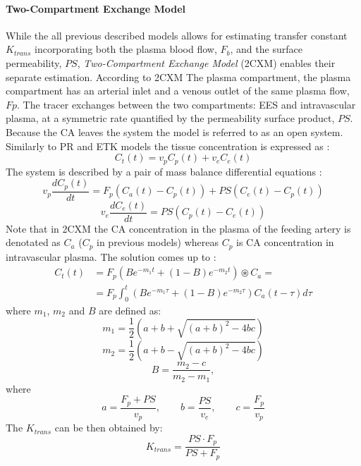 \paragraph{Two-Compartment Exchange Model}While the all previous described models allows for estimating transfer constant $K_{trans}$ incorporating both the plasma blood flow, $F_b$, and the surface permeability, $PS$, \textit{Two-Compartment Exchange Model} (2CXM) enables their separate estimation. 
According to 2CXM The plasma compartment, the plasma compartment has an arterial inlet and a venous outlet of the same plasma flow, $Fp$. 
The tracer exchanges between the two compartments: EES and intravascular plasma, at a symmetric rate quantified by the permeability surface product, $PS$.
Because the CA leaves the system the model is referred to as an open system. 
Similarly to PR and ETK models the tissue concentration is expressed as \cite{khalifa2014models}:
\begin{equation}
C_t(t) = v_pC_p(t) + v_eC_e(t)
\label{eq:2cxm}
\end{equation}
The system is described by a pair of mass balance differential equations \cite{khalifa2014models}:  
\begin{equation}
v_p\frac{dC_p(t)}{dt} = F_p(C_a(t)-C_p(t))+PS(C_e(t)-C_p(t))
\label{eq:2cxm2}
\end{equation}
\begin{equation}
v_e\frac{dC_e(t)}{dt} = PS(C_p(t)-C_e(t))
\label{eq:2cxm3}
\end{equation}
Note that in 2CXM the CA concentration in the plasma of the feeding artery is denotated as $C_a$ ($C_p$ in previous models) whereas $C_p$ is CA concentration in intravascular plasma. The solution comes up to \cite{khalifa2014models}:
\begin{align}
	\label{eq:2cxm4}
	\nonumber C_{t}(t) &=F_p (Be^{-m_1t}+(1-B)e^{-m_2t})\circledast C_a =\\
	&= F_{p} \int_{0}^{t} \left( Be^{-m_1\tau} + (1-B)e^{-m_2\tau} \right) C_{a}(t-\tau)d\tau
\end{align}
where $m_1$, $m_2$ and $B$ are defined as:
\begin {equation} 
m_1 = \frac{1}{2}\left( a+b+\sqrt{(a+b)^2-4bc}\right)
\end{equation}
\begin {equation} 
\nonumber m_2 = \frac{1}{2}\left(a+b-\sqrt{(a+b)^2-4bc}\right)
\end{equation}
\begin {equation} 
\nonumber B = \frac{m_2-c}{m_2-m_1}, 
\end{equation}
where
\begin{equation}
a = \frac{F_p+PS}{v_p},\qquad b = \frac{PS}{v_e},\qquad c = \frac{F_p}{v_p}
\end{equation}
The $K_{trans}$ can be then obtained by:
\begin{equation}
K_{trans} = \frac{PS\cdot{}F_p}{PS+F_p}
\end{equation}

